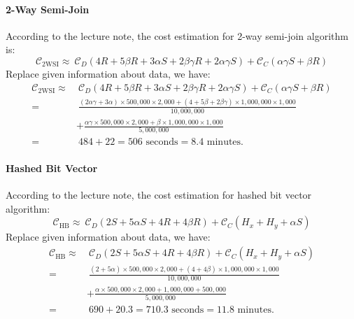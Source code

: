 \documentclass[a4paper,12pt]{article}
\begin{document}
\paragraph{2-Way Semi-Join} According to the lecture note, the cost estimation for 2-way semi-join algorithm is:
$$ \mathcal{C}_{\mbox{2WSI}} \approx \ \mathcal{C}_D(4R + 5 \beta R + 3 \alpha S + 2 \beta \gamma R + 2 \alpha \gamma S) + \mathcal{C}_C(\alpha \gamma S + \beta R)$$
Replace given information about data, we have:
\begin{equation*}
	\begin{aligned}
		\mathcal{C}_{\mbox{2WSI}} \approx & \ \mathcal{C}_D(4R + 5 \beta R + 3 \alpha S + 2 \beta \gamma R + 2 \alpha \gamma S) + \mathcal{C}_C(\alpha \gamma S + \beta R) \\
		= & \ \frac{(2 \alpha \gamma + 3 \alpha) \times 500,000 \times 2,000 + (4 + 5 \beta + 2 \beta \gamma) \times 1,000,000 \times 1,000}{10,000,000}  \\
		& + \frac{\alpha \gamma \times 500,000 \times 2,000 + \beta \times 1,000,000 \times 1,000}{5,000,000} \\
		= & \ 484 + 22 = 506\mbox{ seconds} = 8.4\mbox{ minutes}.
	\end{aligned}
\end{equation*}

\paragraph{Hashed Bit Vector} According to the lecture note, the cost estimation for hashed bit vector algorithm:
$$ \mathcal{C}_{\mbox{HB}} \approx \ \mathcal{C}_D(2S + 5 \alpha S + 4R + 4 \beta R) + \mathcal{C}_C( H_x + H_y + \alpha S)$$
Replace given information about data, we have:
\begin{equation*}
	\begin{aligned}
		\mathcal{C}_{\mbox{HB}} \approx & \ \mathcal{C}_D(2S + 5 \alpha S + 4R + 4 \beta R) + \mathcal{C}_C( H_x + H_y + \alpha S) \\
		= & \ \frac{(2 + 5\alpha) \times 500,000 \times 2,000 + (4 + 4 \beta) \times 1,000,000 \times 1,000}{10,000,000}  \\
		& + \frac{\alpha \times 500,000 \times 2,000 + 1,000,000 + 500,000}{5,000,000} \\
		= & \ 690 + 20.3 = 710.3\mbox{ seconds} = 11.8\mbox{ minutes}.
	\end{aligned}
\end{equation*}
\end{document}
